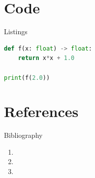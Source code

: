 \documentclass[aspectratio=169, xcolor=table]{beamer}
\begin{document}
\section{Code}
\begin{frame}[fragile]{Listings}
\begin{lstlisting}[language=Python,caption={Simple Python snippet}]
def f(x: float) -> float:
    return x*x + 1.0

print(f(2.0))
\end{lstlisting}
\end{frame}

\section{References}
\begin{frame}[allowframebreaks]{Bibliography}
  \footnotesize
  \begin{enumerate}
    \item {}
    \item {}
    \item {}
  \end{enumerate}
\end{frame}
\end{document}
